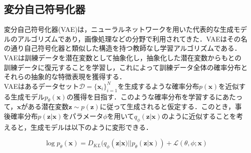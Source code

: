 \documentclass[dvipdfmx]{ampbt_nomag}
\begin{document}
\subsection{変分自己符号化器}

変分自己符号化器(VAE)は，ニューラルネットワークを用いた代表的な生成モデルのアルゴリズムであり，画像処理などの分野で利用されてきた．VAEはその名の通り自己符号化器と類似した構造を持つ教師なし学習アルゴリズムである．VAEは訓練データを潜在変数として抽象化し，抽象化した潜在変数からもとの訓練データに復元することを学習し，これによって訓練データ全体の確率分布とそれらの抽象的な特徴表現を獲得する．\\
VAEはあるデータセット$\mathcal{D}=\{\boldsymbol{x}_i\}^{N}_{i=1}$を生成するような確率分布$p(\boldsymbol{x})$を近似する生成モデル$p_\theta(\boldsymbol{x})$の獲得を目指す．このような確率分布を学習するにあたって，$\boldsymbol{x}$がある潜在変数$\boldsymbol{z}\sim p(\boldsymbol{z})$に従って生成されると仮定する．このとき，事後確率分布$p(\boldsymbol{z}|\boldsymbol{x})$をパラメータ$\phi$を用いて$q_\phi(\boldsymbol{z}|\boldsymbol{x})$のように近似することを考えると，生成モデルは以下のように変形できる．

\begin{equation} \label{latent_val}
  \log{p_\theta(\boldsymbol{x})} = D_{KL}(q_\phi(\boldsymbol{z}|\boldsymbol{x})||p_\theta(\boldsymbol{z}|\boldsymbol{x})) + \mathcal{L}(\theta, \phi; \boldsymbol{x})
\end{equation}
\end{document}
